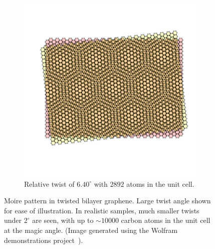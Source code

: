 \begin{figure}
\begin{subfigure}[t]{0.45\linewidth}
        \includegraphics[width=\linewidth]{figures/introduction/6_40Moire.pdf}
        \caption{\centering Relative twist of $6.40^\circ$ with $2892$ atoms in the unit cell.}
        \label{fig:twisted}
    \end{subfigure}
    \caption{Moire pattern in twisted bilayer graphene. Large twist angle shown for ease of illustration. In realistic samples, much smaller twists under $2^\circ$ are seen, with up to $\sim 10000$ carbon atoms in the unit cell at the magic angle. (Image generated using the Wolfram demonstrations project~\cite{MoireWolfram}).}
    \label{fig:MoirePattern}
\end{figure}

